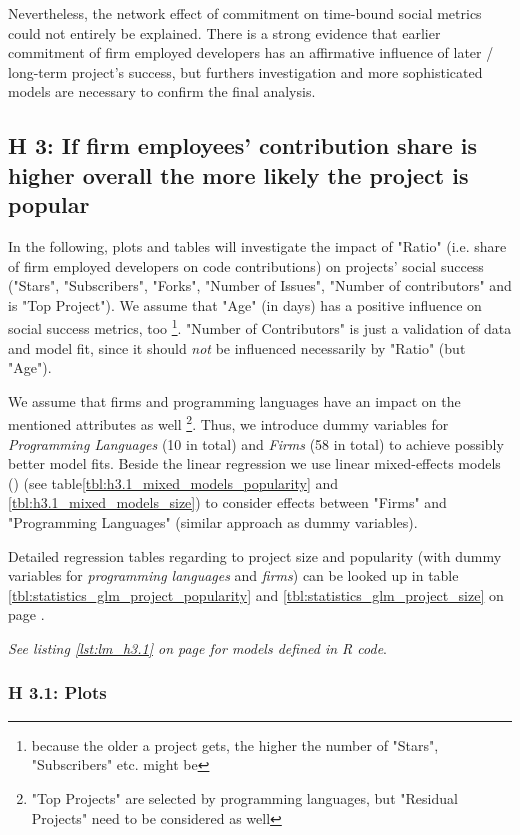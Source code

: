 Nevertheless, the network effect of commitment on time-bound social metrics could not entirely be explained. There is a strong evidence that earlier commitment of firm employed developers has an affirmative influence of later / long-term project's success, but furthers investigation and more sophisticated models are necessary to confirm the final analysis.

\clearpage
\subsection{H 3: If firm employees' contribution share is higher overall the more likely the project is popular}

\normalsize
In the following, plots and tables will investigate the impact of "Ratio" (i.e. share of firm employed developers on code contributions) on projects' social success ("Stars", "Subscribers", "Forks", "Number of Issues", "Number of contributors" and is "Top Project"). We assume that "Age" (in days) has a positive influence on social success metrics, too \footnote{because the older a project gets, the higher the number of "Stars", "Subscribers" etc. might be}. "Number of Contributors" is just a validation of data and model fit, since it should \textit{not} be influenced necessarily by "Ratio" (but "Age").

We assume that firms and programming languages have an impact on the mentioned attributes as well \footnote{"Top Projects" are selected by programming languages, but "Residual Projects" need to be considered as well}. Thus, we introduce dummy variables for \textit{Programming Languages} (10 in total) and \textit{Firms} (58 in total) to achieve possibly better model fits. Beside the linear regression we use linear mixed-effects models (\cite{R_lme4}) (see table\ref{tbl:h3.1_mixed_models_popularity} and \ref{tbl:h3.1_mixed_models_size}) to consider effects between "Firms" and "Programming Languages" (similar approach as dummy variables).

Detailed regression tables regarding to project size and popularity (with dummy variables for \textit{programming languages} and \textit{firms}) can be looked up in table \ref{tbl:statistics_glm_project_popularity} and \ref{tbl:statistics_glm_project_size} on page \pageref{tbl:statistics_glm_project_popularity}.

\textit{See listing \ref{lst:lm_h3.1} on page \pageref{lst:lm_h3.1} for models defined in R code}.

\subsubsection{H 3.1: Plots}

